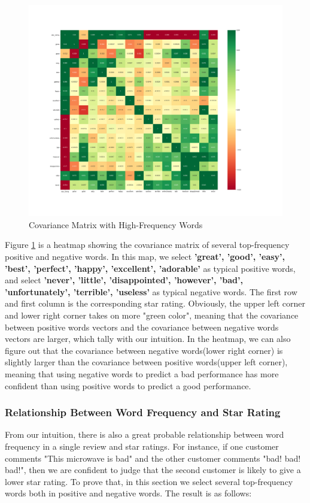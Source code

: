 \documentclass[12pt]{article}  %
\begin{document}
\begin{figure}[!htbp]
\centering
\includegraphics[width=.9\textwidth]{heatmap.png}
\caption{Covariance Matrix with High-Frequency Words}\label{fig:heatmap}
\end{figure}

Figure \ref{fig:heatmap} is a heatmap showing the covariance matrix of several top-frequency positive and negative words. In this map, we select \textbf{'great', 'good', 'easy', 'best', 'perfect', 'happy', 'excellent', 'adorable'} as typical positive words, and select \textbf{'never', 'little', 'disappointed', 'however', 'bad', 'unfortunately', 'terrible', 'useless'} as typical negative words. The first row and first column is the corresponding star rating. Obviously, the upper left corner and lower right corner takes on more "green color", meaning that the covariance between positive words vectors and the covariance between negative words vectors are larger, which tally with our intuition. In the heatmap, we can also figure out that the covariance between negative words(lower right corner) is slightly larger than the covariance between positive words(upper left corner), meaning that using negative words to predict a bad performance has more confident than using positive words to predict a good performance.

\subsubsection{Relationship Between Word Frequency and Star Rating}
From our intuition, there is also a great probable relationship between word frequency in a single review and star ratings.  For instance, if one customer comments "This microwave is bad" and the other customer comments "bad! bad! bad!", then we are confident to judge that the second customer is likely to give a lower star rating. To prove that, in this section we select several top-frequency words both in positive and negative words. The result is as follows:
\end{document}
